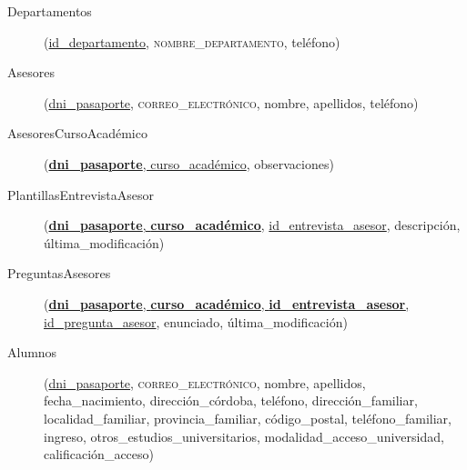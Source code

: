   \begin{description}
    \item[Departamentos] \begin{flushleft}(\underline{id\_departamento},
    \textsc{nombre\_departamento}, teléfono)\end{flushleft}
  \end{description}

  \begin{description}
    \item[Asesores] \begin{flushleft}(\underline{dni\_pasaporte},
    \textsc{correo\_electrónico}, nombre, apellidos, teléfono)\end{flushleft}
  \end{description}

  \begin{description}
    \item[AsesoresCursoAcadémico] \begin{flushleft}(\underline{\textbf{dni\_pasaporte},
    curso\_académico}, observaciones)\end{flushleft}
  \end{description}

  \begin{description}
    \item[PlantillasEntrevistaAsesor] \begin{flushleft}(\underline{\textbf{dni\_pasaporte},
    \textbf{curso\_académico},} \underline{id\_entrevista\_asesor}, descripción,
    última\_modificación)\end{flushleft}
  \end{description}

  \begin{description}
    \item[PreguntasAsesores] \begin{flushleft}(\underline{\textbf{dni\_pasaporte},
    \textbf{curso\_académico}, \textbf{id\_entrevista\_asesor},}
    \underline{id\_pregunta\_asesor}, enunciado, última\_modificación)\end{flushleft}
  \end{description}

  \begin{description}
    \item[Alumnos] \begin{flushleft}(\underline{dni\_pasaporte},
    \textsc{correo\_electrónico}, nombre, apellidos, fecha\_nacimiento,
    dirección\_córdoba, teléfono, dirección\_familiar, localidad\_familiar,
    provincia\_familiar, código\_postal, teléfono\_familiar, ingreso,
    otros\_estudios\_universitarios, modalidad\_acceso\_universidad,
    calificación\_acceso)\end{flushleft}
  \end{description}


